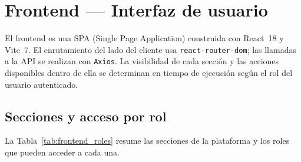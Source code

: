 \section{Frontend — Interfaz de usuario}
\label{sec:frontend}

El frontend es una SPA (Single Page Application) construida con React~18 y Vite~7.
El enrutamiento del lado del cliente usa \texttt{react-router-dom};
las llamadas a la API se realizan con \texttt{Axios}.
La visibilidad de cada sección y las acciones disponibles dentro de ella
se determinan en tiempo de ejecución según el rol del usuario autenticado.

\subsection*{Secciones y acceso por rol}

La Tabla~\ref{tab:frontend_roles} resume las secciones de la plataforma
y los roles que pueden acceder a cada una.

